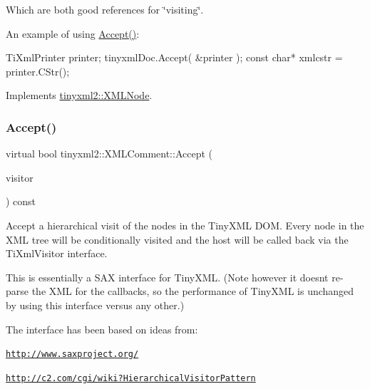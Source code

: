 Which are both good references for \char`\"{}visiting\char`\"{}.

An example of using \hyperlink{classtinyxml2_1_1XMLComment_a27b37d16cea01b5329dfbbb4f9508e39}{Accept()}\+: \begin{DoxyVerb}TiXmlPrinter printer;
tinyxmlDoc.Accept( &printer );
const char* xmlcstr = printer.CStr();
\end{DoxyVerb}
 

Implements \hyperlink{classtinyxml2_1_1XMLNode_a81e66df0a44c67a7af17f3b77a152785}{tinyxml2\+::\+X\+M\+L\+Node}.

\mbox{\label{classtinyxml2_1_1XMLComment_a4a33dc32fae0285b03f9cfcb3e43e122}} 
\subsubsection{\texorpdfstring{Accept()}{Accept()}\hspace{0.1cm}{\footnotesize\ttfamily [2/2]}}
{\footnotesize\ttfamily virtual bool tinyxml2\+::\+X\+M\+L\+Comment\+::\+Accept (\begin{DoxyParamCaption}\item[{\hyperlink{classtinyxml2_1_1XMLVisitor}{X\+M\+L\+Visitor} $\ast$}]{visitor }\end{DoxyParamCaption}) const\hspace{0.3cm}{\ttfamily [virtual]}}

Accept a hierarchical visit of the nodes in the Tiny\+X\+ML D\+OM. Every node in the X\+ML tree will be conditionally visited and the host will be called back via the Ti\+Xml\+Visitor interface.

This is essentially a S\+AX interface for Tiny\+X\+ML. (Note however it doesn\textquotesingle{}t re-\/parse the X\+ML for the callbacks, so the performance of Tiny\+X\+ML is unchanged by using this interface versus any other.)

The interface has been based on ideas from\+:


\begin{DoxyItemize}
\item \href{http://www.saxproject.org/}{\tt http\+://www.\+saxproject.\+org/}
\item \href{http://c2.com/cgi/wiki?HierarchicalVisitorPattern}{\tt http\+://c2.\+com/cgi/wiki?\+Hierarchical\+Visitor\+Pattern}
\end{DoxyItemize}

